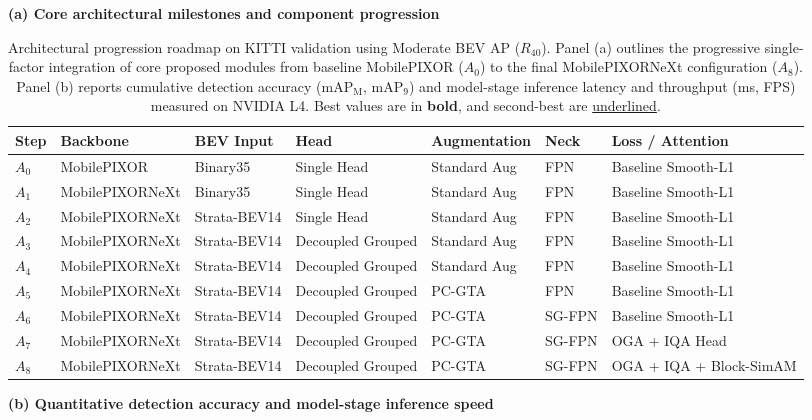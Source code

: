 \begin{table}[t]
\centering\small
\caption{Architectural progression roadmap on KITTI validation using Moderate BEV AP ($R_{40}$). Panel (a) outlines the progressive single-factor integration of core proposed modules from baseline MobilePIXOR ($A_0$) to the final MobilePIXORNeXt configuration ($A_8$). Panel (b) reports cumulative detection accuracy ($\text{mAP}_{\mathrm{M}}$, $\text{mAP}_9$) and model-stage inference latency and throughput (ms, FPS) measured on NVIDIA L4. Best values are in \textbf{bold}, and second-best are \underline{underlined}.}
\label{tab:components}
\textbf{(a) Core architectural milestones and component progression}\par\smallskip
\begingroup\footnotesize\setlength{\tabcolsep}{1.5pt}
\begin{tabular*}{\textwidth}{@{\extracolsep{\fill}}lllllll@{}}
\toprule
\textbf{Step} & \textbf{Backbone} & \textbf{BEV Input} & \textbf{Head} & \textbf{Augmentation} & \textbf{Neck} & \textbf{Loss / Attention} \\
\midrule
$A_0$ & MobilePIXOR & Binary35 & Single Head & Standard Aug & FPN & Baseline Smooth-L1 \\
$A_1$ & MobilePIXORNeXt & Binary35 & Single Head & Standard Aug & FPN & Baseline Smooth-L1 \\
$A_2$ & MobilePIXORNeXt & Strata-BEV14 & Single Head & Standard Aug & FPN & Baseline Smooth-L1 \\
$A_3$ & MobilePIXORNeXt & Strata-BEV14 & Decoupled Grouped & Standard Aug & FPN & Baseline Smooth-L1 \\
$A_4$ & MobilePIXORNeXt & Strata-BEV14 & Decoupled Grouped & Standard Aug & FPN & Baseline Smooth-L1 \\
$A_5$ & MobilePIXORNeXt & Strata-BEV14 & Decoupled Grouped & PC-GTA & FPN & Baseline Smooth-L1 \\
$A_6$ & MobilePIXORNeXt & Strata-BEV14 & Decoupled Grouped & PC-GTA & SG-FPN & Baseline Smooth-L1 \\
$A_7$ & MobilePIXORNeXt & Strata-BEV14 & Decoupled Grouped & PC-GTA & SG-FPN & OGA + IQA Head \\
$A_8$ & MobilePIXORNeXt & Strata-BEV14 & Decoupled Grouped & PC-GTA & SG-FPN & OGA + IQA + Block-SimAM \\
\bottomrule
\end{tabular*}\endgroup
\par\medskip
\textbf{(b) Quantitative detection accuracy and model-stage inference speed}\par\smallskip

\end{table}
